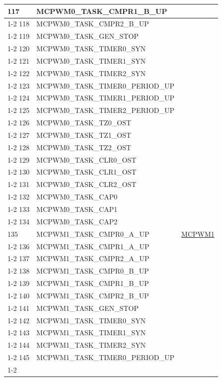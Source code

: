 \documentclass[main\_\_CN.tex]{subfiles}
\begin{document}
\begin{longtable}{ | l | l | l | }
117 & MCPWM0\_TASK\_CMPR1\_B\_UP& \\ \cline{1-2}
118 & MCPWM0\_TASK\_CMPR2\_B\_UP& \\ \cline{1-2}
119 & MCPWM0\_TASK\_GEN\_STOP & \\ \cline{1-2}
120 & MCPWM0\_TASK\_TIMER0\_SYN & \\ \cline{1-2}
121 & MCPWM0\_TASK\_TIMER1\_SYN & \\ \cline{1-2}
122 & MCPWM0\_TASK\_TIMER2\_SYN & \\ \cline{1-2}
123 & MCPWM0\_TASK\_TIMER0\_PERIOD\_UP      & \\ \cline{1-2}
124 & MCPWM0\_TASK\_TIMER1\_PERIOD\_UP      & \\ \cline{1-2}
125 & MCPWM0\_TASK\_TIMER2\_PERIOD\_UP      & \\ \cline{1-2}
126 & MCPWM0\_TASK\_TZ0\_OST  & \\ \cline{1-2}
127 & MCPWM0\_TASK\_TZ1\_OST  & \\ \cline{1-2}
128 & MCPWM0\_TASK\_TZ2\_OST  & \\ \cline{1-2}
129 & MCPWM0\_TASK\_CLR0\_OST & \\ \cline{1-2}
130 & MCPWM0\_TASK\_CLR1\_OST & \\ \cline{1-2}
131 & MCPWM0\_TASK\_CLR2\_OST & \\ \cline{1-2}
132 & MCPWM0\_TASK\_CAP0      & \\ \cline{1-2}
133 & MCPWM0\_TASK\_CAP1      & \\ \cline{1-2}
134 & MCPWM0\_TASK\_CAP2      & \\ \hline
135 & MCPWM1\_TASK\_CMPR0\_A\_UP& \hyperref[mod:mcpwm]{MCPWM1}\\ \cline{1-2}
136 & MCPWM1\_TASK\_CMPR1\_A\_UP& \\ \cline{1-2}
137 & MCPWM1\_TASK\_CMPR2\_A\_UP& \\ \cline{1-2}
138 & MCPWM1\_TASK\_CMPR0\_B\_UP& \\ \cline{1-2}
139 & MCPWM1\_TASK\_CMPR1\_B\_UP& \\ \cline{1-2}
140 & MCPWM1\_TASK\_CMPR2\_B\_UP& \\ \cline{1-2}
141 & MCPWM1\_TASK\_GEN\_STOP & \\ \cline{1-2}
142 & MCPWM1\_TASK\_TIMER0\_SYN & \\ \cline{1-2}
143 & MCPWM1\_TASK\_TIMER1\_SYN & \\ \cline{1-2}
144 & MCPWM1\_TASK\_TIMER2\_SYN & \\ \cline{1-2}
145 & MCPWM1\_TASK\_TIMER0\_PERIOD\_UP      & \\ \cline{1-2}

\end{longtable}
\end{document}
